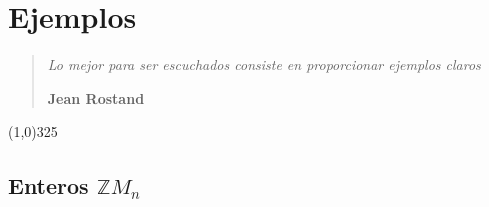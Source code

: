 \chapter{Ejemplos}

\begin{flushright}
  \begin{minipage}[t]{13cm}
    \begin{flushright}
      \begin{quote}
        \emph{
          Lo mejor para ser escuchados consiste en proporcionar ejemplos claros
        }
        \begin{flushright}
          \textbf{\textemdash Jean Rostand}
        \end{flushright}
      \end{quote}
    \end{flushright}
  \end{minipage}
\end{flushright}

\bigskip

\begin{center}{\line(1,0){325}}\end{center}


 
\section{Enteros $\mathbb{Z}M_n$}\label{ejZM_n}


